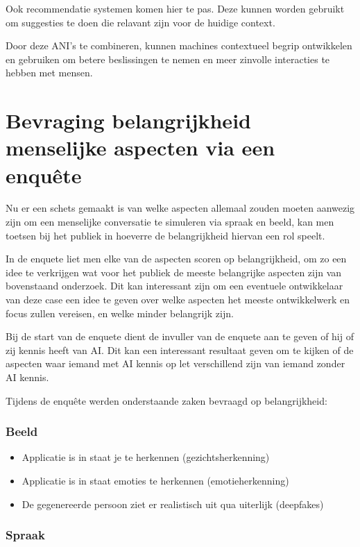 Ook recommendatie systemen komen hier te pas. Deze kunnen worden gebruikt om suggesties te doen die relavant zijn voor de huidige context.

Door deze ANI's te combineren, kunnen machines contextueel begrip ontwikkelen en gebruiken om betere beslissingen te nemen en meer zinvolle interacties te hebben met mensen.

\newpage

\section{Bevraging belangrijkheid menselijke aspecten via een enquête}

Nu er een schets gemaakt is van welke aspecten allemaal zouden moeten aanwezig zijn om een menselijke conversatie te simuleren via spraak en beeld, kan men toetsen bij het publiek in hoeverre de belangrijkheid hiervan een rol speelt.

In de enquete liet men elke van de aspecten scoren op belangrijkheid, om zo een idee te verkrijgen wat voor het publiek de meeste belangrijke aspecten zijn van bovenstaand onderzoek. Dit kan interessant zijn om een eventuele ontwikkelaar van deze case een idee te geven over welke aspecten het meeste ontwikkelwerk en focus zullen vereisen, en welke minder belangrijk zijn.

Bij de start van de enquete dient de invuller van de enquete aan te geven of hij of zij kennis heeft van AI. Dit kan een interessant resultaat geven om te kijken of de aspecten waar iemand met AI kennis op let verschillend zijn van iemand zonder AI kennis.

Tijdens de enquête werden onderstaande zaken bevraagd op belangrijkheid:

\subsubsection{Beeld}

\begin{itemize}
    \item Applicatie is in staat je te herkennen (gezichtsherkenning)
    \item Applicatie is in staat emoties te herkennen (emotieherkenning)
    \item De gegenereerde persoon ziet er realistisch uit qua uiterlijk (deepfakes)
\end{itemize}

\subsubsection{Spraak}

